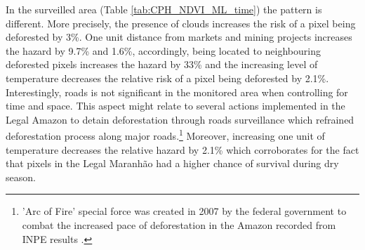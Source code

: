 In the surveilled area (Table \ref{tab:CPH_NDVI_ML_time})  the pattern is different. More precisely, the presence of clouds increases the risk of a pixel being deforested by 3\%. One unit distance from markets and mining projects increases the hazard by 9.7\% and 1.6\%, accordingly, being located to neighbouring deforested pixels increases the hazard by 33\% and the increasing level of temperature decreases the relative risk of a pixel being deforested by 2.1\%.  Interestingly, roads is not significant in the monitored area when controlling for time and space. This aspect might relate to several actions implemented in the Legal Amazon to detain deforestation through roads surveillance which refrained deforestation process along major roads.\footnote{'Arc of Fire' special force was created in 2007 by the federal government to combat the increased pace of deforestation in the Amazon recorded from INPE results \citep{PF_arcodofogo,inpe-deter_2018}.} Moreover, increasing one unit of temperature decreases the relative hazard by 2.1\% which corroborates for the fact that pixels in the Legal Maranhão had a higher chance of survival during dry season.  

